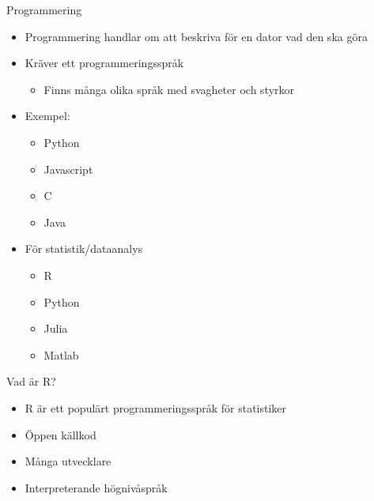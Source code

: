 \documentclass[
  10pt,
  ignorenonframetext,
]{beamer}
\providecommand{\tightlist}{%
  \setlength{\itemsep}{0pt}\setlength{\parskip}{0pt}}
\begin{document}
\begin{frame}{Programmering}
\protect\hypertarget{programmering}{}
\begin{itemize}
\tightlist
\item
  Programmering handlar om att beskriva för en dator vad den ska göra
\item
  Kräver ett programmeringsspråk

  \begin{itemize}
  \tightlist
  \item
    Finns många olika språk med svagheter och styrkor
  \end{itemize}
\item
  Exempel:

  \begin{itemize}
  \tightlist
  \item
    Python
  \item
    Javascript
  \item
    C
  \item
    Java
  \end{itemize}
\item
  För statistik/dataanalys

  \begin{itemize}
  \tightlist
  \item
    R
  \item
    Python
  \item
    Julia
  \item
    Matlab
  \end{itemize}
\end{itemize}
\end{frame}

\begin{frame}{Vad är R?}
\protect\hypertarget{vad-uxe4r-r}{}
\begin{itemize}[<+->]
\tightlist
\item
  R är ett populärt programmeringsspråk för statistiker
\item
  Öppen källkod
\item
  Många utvecklare
\item
  Interpreterande högnivåspråk
\end{itemize}
\end{frame}
\end{document}
